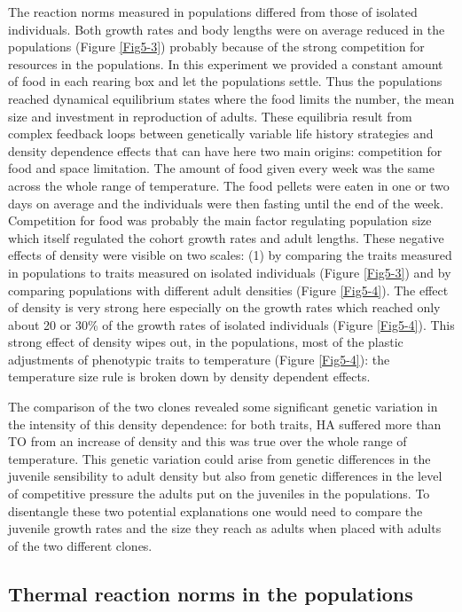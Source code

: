 The reaction norms measured in populations differed from those of isolated
individuals. Both growth rates and body lengths were on average reduced in the
populations (Figure \ref{Fig5-3}) probably because of the strong competition for
resources in the populations. In this experiment we provided a constant amount
of food in each rearing box and let the populations settle. Thus the populations
reached dynamical equilibrium states where the food limits the number, the mean
size and investment in reproduction of adults. These equilibria result from
complex feedback loops between genetically variable life history strategies
\autocite{tully2008a} and density dependence effects \autocite{kokko2007a} that
can have here two main origins: competition for food and space limitation. The
amount of food given every week was the same across the whole range of
temperature. The food pellets were eaten in one or two days on average and the
individuals were then fasting until the end of the week. Competition for food
was probably the main factor regulating population size which itself regulated
the cohort growth rates and adult lengths. These negative effects of density
were visible on two scales: (1) by comparing the traits measured in populations
to traits measured on isolated individuals (Figure \ref{Fig5-3}) and by
comparing populations with different adult densities (Figure \ref{Fig5-4}).
The effect of density is very strong here especially on the growth rates which reached only about 20 or 30\% of the
growth rates of isolated individuals (Figure \ref{Fig5-4}). This strong effect
of density wipes out, in the populations, most of the plastic adjustments of phenotypic
traits to temperature (Figure \ref{Fig5-4}): the temperature size rule is broken
down by density dependent effects.

The comparison of the two clones revealed some significant genetic variation in
the intensity of this density dependence: for both traits, HA suffered more than
TO from an increase of density and this was true over the whole range of
temperature. This genetic variation could arise from genetic differences in the
juvenile sensibility to adult density but also from genetic differences in the
level of competitive pressure the adults put on the juveniles in the
populations. To disentangle these two potential explanations one would need to
compare the juvenile growth rates and the size they reach as adults when placed
with adults of the two different clones.

\subsection{Thermal reaction norms in the populations}


